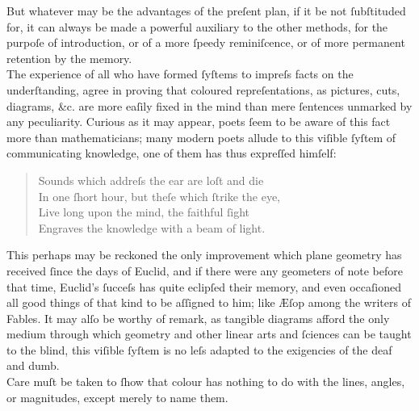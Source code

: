 \begin{minipage}{0.20\textwidth}
    \phantom{}
\end{minipage}%
\begin{minipage}{0.80\textwidth}
    But whatever may be the advantages of the preſent plan, if it be not ſubſtituded for, it can always be made a powerful auxiliary to the other methods, for the purpoſe of introduction, or of a more ſpeedy reminiſcence, or of more permanent retention by the memory.\\

    The experience of all who have formed ſyſtems to impreſs facts on the underſtanding, agree in proving that coloured repreſentations, as pictures, cuts, diagrams, \&c. are more eaſily fixed in the mind than mere ſentences unmarked by any peculiarity. Curious as it may appear, poets ſeem to be aware of this fact more than mathematicians; many modern poets allude to this viſible ſyſtem of communicating knowledge, one of them has thus expreſſed himſelf:\\
    \begin{quotation}
        \small{\noindent Sounds which addreſs the ear are loſt and die\\
            In one ſhort hour, but theſe which ſtrike the eye,\\
            Live long upon the mind, the faithful ſight\\
            Engraves the knowledge with a beam of light.}
    \end{quotation}

    \hfill

    This perhaps may be reckoned the only improvement which plane geometry has received ſince the days of Euclid, and if there were any geometers of note before that time, Euclid’s ſucceſs has quite eclipſed their memory, and even occaſioned all good things of that kind to be aſſigned to him; like Æſop among the writers of Fables. It may alſo be worthy of remark, as tangible diagrams afford the only medium through which geometry and other linear arts and ſciences can be taught to the blind, this viſible ſyſtem is no leſs adapted to the exigencies of the deaf and dumb.\\

    Care muſt be taken to ſhow that colour has nothing to do with the lines, angles, or magnitudes, except merely to name them.
\end{minipage}

\newpage

